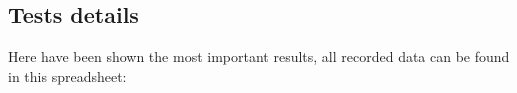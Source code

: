 	\subsection{Tests details}
		Here have been shown the most important results, all recorded data can be found in this spreadsheet:
		
		\href{https://docs.google.com/spreadsheets/d/1wJ98av-soxw_okteJ7X8zMJUfesh_16ECjA9uRbP8Hg/edit?usp=sharing}{\color{blue}{https://docs.google.com/spreadsheets/d/1wJ98av-soxw\_okteJ7X8zMJUfesh\_16ECjA9uRbP8Hg/edit?usp=sharing}}
		